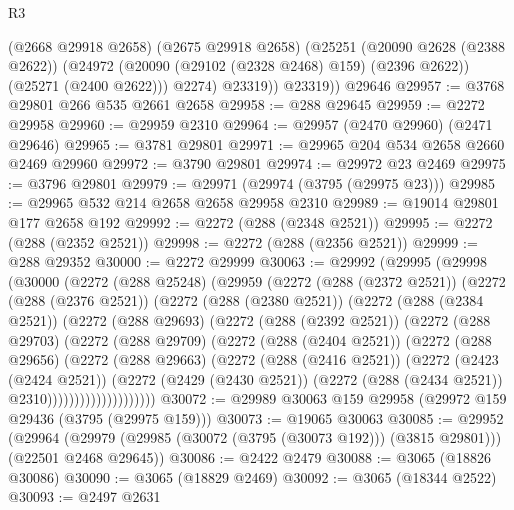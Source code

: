 \begin{lexlean}{R3}
\begin{coremodule}
            (@2668 @29918 @2658)
            (@2675 @29918 @2658)
            (@25251
              (@20090 @2628 (@2388 @2622))
              (@24972 (@20090 (@29102 (@2328 @2468) @159) (@2396 @2622)) (@25271 (@2400 @2622)))
              @2274)
            @23319))
        @23319))
    @29646
@29957 := @3768 @29801 @266 @535 @2661 @2658
@29958 := @288 @29645
@29959 := @2272 @29958
@29960 := @29959 @2310
@29964 := @29957 (@2470 @29960) (@2471 @29646)
@29965 := @3781 @29801
@29971 := @29965 @204 @534 @2658 @2660 @2469 @29960
@29972 := @3790 @29801
@29974 := @29972 @23 @2469
@29975 := @3796 @29801
@29979 := @29971 (@29974 (@3795 (@29975 @23)))
@29985 := @29965 @532 @214 @2658 @2658 @29958 @2310
@29989 := @19014 @29801 @177 @2658 @192
@29992 := @2272 (@288 (@2348 @2521))
@29995 := @2272 (@288 (@2352 @2521))
@29998 := @2272 (@288 (@2356 @2521))
@29999 := @288 @29352
@30000 := @2272 @29999
@30063 := @29992
    (@29995
      (@29998
        (@30000
          (@2272
            (@288 @25248)
            (@29959
              (@2272
                (@288 (@2372 @2521))
                (@2272
                  (@288 (@2376 @2521))
                  (@2272
                    (@288 (@2380 @2521))
                    (@2272
                      (@288 (@2384 @2521))
                      (@2272
                        (@288 @29693)
                        (@2272
                          (@288 (@2392 @2521))
                          (@2272
                            (@288 @29703)
                            (@2272
                              (@288 @29709)
                              (@2272
                                (@288 (@2404 @2521))
                                (@2272
                                  (@288 @29656)
                                  (@2272
                                    (@288 @29663)
                                    (@2272
                                      (@288 (@2416 @2521))
                                      (@2272
                                        (@2423 (@2424 @2521))
                                        (@2272
                                          (@2429 (@2430 @2521))
                                          (@2272 (@288 (@2434 @2521)) @2310))))))))))))))))))))
@30072 := @29989 @30063 @159 @29958 (@29972 @159 @29436 (@3795 (@29975 @159)))
@30073 := @19065 @30063
@30085 := @29952
    (@29964 (@29979 (@29985 (@30072 (@3795 (@30073 @192))) (@3815 @29801))) (@22501 @2468 @29645))
@30086 := @2422 @2479
@30088 := @3065 (@18826 @30086)
@30090 := @3065 (@18829 @2469)
@30092 := @3065 (@18344 @2522)
@30093 := @2497 @2631

\end{coremodule}
\end{lexlean}
